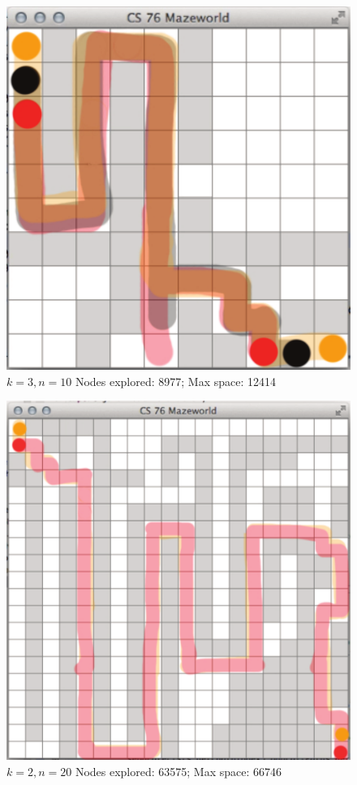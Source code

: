 \documentclass{article}
\begin{document}
\begin{figure}[!htb]
\centering
\includegraphics[scale=.65]{multimaze10.pdf}
\caption{{\bf $k=3, n=10$} Nodes explored: 8977; Max space: 12414}
\end{figure}

\begin{figure}[!htb]
\centering
\includegraphics[scale=.7]{multimaze20.pdf}
\caption{{\bf $k=2, n=20$} Nodes explored: 63575; Max space: 66746}
\end{figure}
\end{document}
